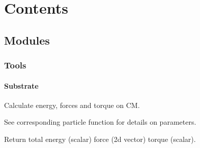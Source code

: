 \documentclass[letterpaper,10pt,english]{sphinxmanual}
\begin{document}
\chapter{Contents}
\label{\detokenize{index:contents}}
\sphinxstepscope


\section{Modules}
\label{\detokenize{modules:modules}}\label{\detokenize{modules::doc}}

\subsection{Tools}
\label{\detokenize{modules:tools}}
\sphinxstepscope


\subsubsection{Substrate}
\label{\detokenize{tool_create_substrate:module-tool_create_substrate}}\label{\detokenize{tool_create_substrate:substrate}}\label{\detokenize{tool_create_substrate::doc}}

\begin{fulllineitems}
\label{\detokenize{tool_create_substrate:tool_create_substrate.calc_en_gaussian}}
\pysigstartsignatures
{}
\pysigstopsignatures
\sphinxAtStartPar
Calculate energy, forces and torque on CM.

\sphinxAtStartPar
See corresponding particle function for details on parameters.

\sphinxAtStartPar
Return total energy (scalar) force (2d vector) torque (scalar).

\end{fulllineitems}

\end{document}
